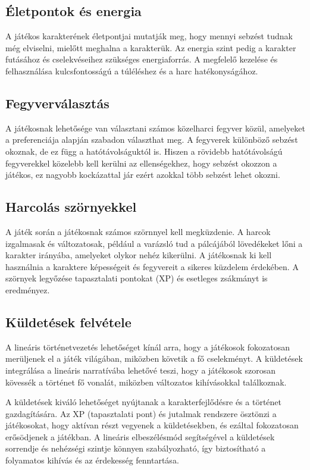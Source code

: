 \subsection{Életpontok és energia}

 A játékos karakterének életpontjai mutatják meg, hogy mennyi sebzést tudnak még elviselni, mielőtt meghalna a karakterük. Az energia szint pedig a karakter futásához és cselekvéseihez szükséges energiaforrás. A megfelelő kezelése és felhasználása kulcsfontosságú a túléléshez és a harc hatékonyságához.

\subsection{Fegyverválasztás}

 A játékosnak lehetősége van választani számos közelharci fegyver közül, amelyeket a preferenciája alapján szabadon választhat meg. A fegyverek különböző sebzést okoznak, de ez függ a hatótávolságuktól is. Hiszen a rövidebb hatótávolságú fegyverekkel közelebb kell kerülni az ellenségekhez, hogy sebzést okozzon a játékos, ez nagyobb kockázattal jár ezért azokkal több sebzést lehet okozni.

\subsection{Harcolás szörnyekkel}

 A játék során a játékosnak számos szörnnyel kell megküzdenie. A harcok izgalmasak és változatosak, például a varázsló tud a pálcájából lövedékeket lőni a karakter irányába, amelyeket olykor nehéz kikerülni. A játékosnak ki kell használnia a karaktere képességeit és fegyvereit a sikeres küzdelem érdekében. A szörnyek legyőzése tapasztalati pontokat (XP) és esetleges zsákmányt is eredményez.

\subsection{Küldetések felvétele}

 A lineáris történetvezetés lehetőséget kínál arra, hogy a játékosok fokozatosan merüljenek el a játék világában, miközben követik a fő cselekményt. A küldetések integrálása a lineáris narratívába lehetővé teszi, hogy a játékosok szorosan kövessék a történet fő vonalát, miközben változatos kihívásokkal találkoznak.

A küldetések kiváló lehetőséget nyújtanak a karakterfejlődésre és a történet gazdagítására. Az XP (tapasztalati pont) és jutalmak rendszere ösztönzi a játékosokat, hogy aktívan részt vegyenek a küldetésekben, és ezáltal fokozatosan erősödjenek a játékban. A lineáris elbeszélésmód segítségével a küldetések sorrendje és nehézségi szintje könnyen szabályozható, így biztosítható a folyamatos kihívás és az érdekesség fenntartása.

